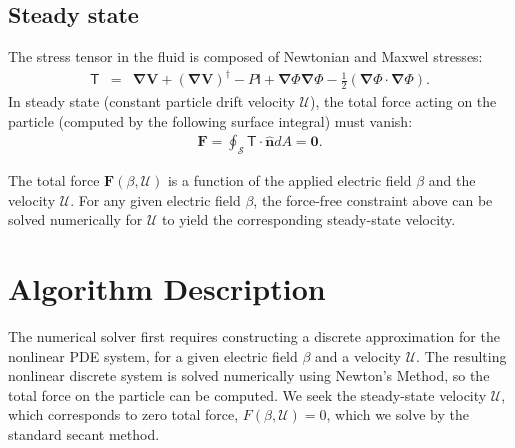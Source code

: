 \documentclass[10pt]{ijnam}
\newcommand\bnabla{\boldsymbol{\nabla}}
\newcommand\bV{\boldsymbol{V}}
\newcommand\bF{\boldsymbol{F}}
\newcommand\bnhat{\hat{\boldsymbol{n}}}
\newcommand\bzero{\boldsymbol{0}}
\newcommand\cU{\mathscr{U}}
\newcommand\tI{\mathsf{I}}
\newcommand\tT{\mathsf{T}}
\begin{document}
\subsection{Steady state}
The stress tensor in the fluid is composed of Newtonian and Maxwel stresses:
\begin{eqnarray} \label{eq:tensor}
\tT &=& \bnabla \bV + (\bnabla \bV)^\dagger - P \tI
+ \bnabla \varPhi \bnabla \varPhi - \frac{1}{2} (\bnabla \varPhi \cdot \bnabla \varPhi). 
\end{eqnarray}
In steady state (constant particle drift velocity $\cU$), the total force acting on the particle 
(computed by the following surface integral) must vanish:
\begin{eqnarray} \label{eq:zero_force}
 \bF = \oint_\mathcal{S} \tT \cdot \bnhat dA = \bzero.
\end{eqnarray}

The total force $\bF(\beta, \cU)$ is a function of the applied electric field $\beta$ and
the velocity $\cU$.
For any given electric field $\beta$, the force-free constraint above 
can be solved numerically for $\cU$ to yield the corresponding steady-state velocity.

\section{Algorithm Description} \label{sec:algorithm}
The numerical solver first requires constructing a discrete 
approximation for the nonlinear PDE system,
for a given electric field $\beta$ and a velocity $\cU$. 
The resulting nonlinear discrete system is
solved numerically using Newton's Method, so the total force on the
particle can be computed. 
We seek the steady-state velocity $\cU$, 
which corresponds to zero total force, $F(\beta, \cU) = 0$,
which we solve by the standard secant method.
\end{document}
